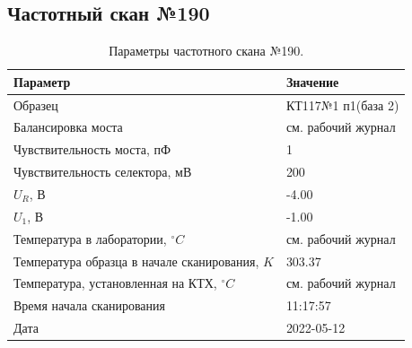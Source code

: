 \subsection{Частотный скан №190}
\begin{table}[!ht]
    \centering
    \caption{Параметры частотного скана №190.}
    \begin{tabular}{|l|l|}
        \hline
        Параметр                                       & Значение                  \\ \hline
        Образец                                        & КТ117№1 п1(база 2)        \\ \hline
        Балансировка моста                             & см. рабочий журнал        \\ \hline
        Чувствительность моста, пФ                     & 1                         \\ \hline
        Чувствительность селектора, мВ                 & 200                       \\ \hline
        $U_R$, В                                       & -4.00                     \\ \hline
        $U_1$, В                                       & -1.00                     \\ \hline
        Температура в лаборатории, $^\circ C$          & см. рабочий журнал        \\ \hline
        Температура образца в начале сканирования, $K$ & 303.37                    \\ \hline
        Температура, установленная на КТХ, $^\circ C$  & см. рабочий журнал        \\ \hline
        Время начала сканирования                      & 11:17:57                  \\ \hline
        Дата                                           & 2022-05-12                \\ \hline
    \end{tabular}
    \label{table:frequency_scan_190}
\end{table}

